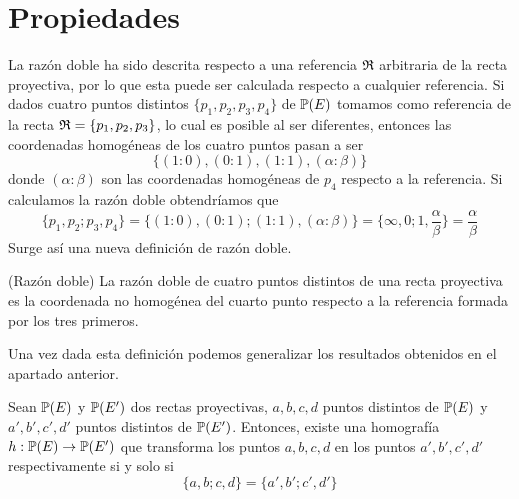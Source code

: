 \section{Propiedades}
La razón doble ha sido descrita respecto a una referencia $\mathfrak{R}$ arbitraria de la recta proyectiva, por lo que esta puede ser calculada respecto a cualquier referencia. Si dados cuatro puntos distintos $\{p_1,p_2,p_3,p_4\}$ de $\mathbb{P}(E)$ tomamos como referencia de la recta $\mathfrak{R}=\{p_1,p_2,p_3\}$, lo cual es posible al ser diferentes, entonces las coordenadas homogéneas de los cuatro puntos pasan a ser
\begin{equation*}
	\{(1:0),(0:1),(1:1),(\alpha:\beta)\}
\end{equation*}
donde $(\alpha:\beta)$ son las coordenadas homogéneas de $p_4$ respecto a la referencia. Si calculamos la razón doble obtendríamos que 
\begin{equation}
	\{p_1,p_2;p_3,p_4\}=\{(1:0),(0:1);(1:1),(\alpha:\beta)\}=\{\infty,0;1,\frac{\alpha}{\beta}\}=\frac{\alpha}{\beta}
\end{equation}
Surge así una nueva definición de razón doble.
\begin{defi}(Razón doble)
	La razón doble de cuatro puntos distintos de una recta proyectiva es la coordenada no homogénea del cuarto punto respecto a la referencia formada por los tres primeros.
\end{defi}
Una vez dada esta definición podemos generalizar los resultados obtenidos en el apartado anterior.
\begin{theo}
	Sean $\mathbb{P}(E)$ y $\mathbb{P}(E')$ dos rectas proyectivas, $a,b,c,d$ puntos distintos de $\mathbb{P}(E)$ y $a',b',c',d'$ puntos distintos de $\mathbb{P}(E')$. Entonces, existe una homografía $h:\mathbb{P}(E)\rightarrow \mathbb{P}(E')$ que transforma los puntos $a,b,c,d$ en los puntos $a',b',c',d'$ respectivamente si y solo si 
	\begin{equation*}
		\{a,b;c,d\}=\{a',b';c',d'\}
	\end{equation*}
\end{theo}

